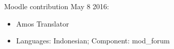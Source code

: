 \documentclass{article}
\begin{document}
Moodle contribution May 8 2016:
\begin{itemize}
	\item Amos Translator
	\item Languages: Indonesian; Component: mod_forum
\end{itemize}
\end{document}
